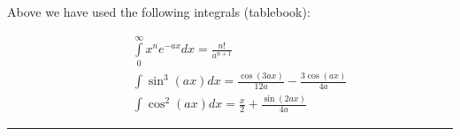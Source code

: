 \begin{enumerate}
Above we have used the following integrals (tablebook):

\begin{eqnarray}
\nonumber
& & \int\limits_{0}^{\infty} x^n e^{-ax}dx = \frac{n!}{a^{n+1}}\\
\nonumber
& & \int\sin^3(ax)dx = \frac{\cos(3ax)}{12a} - \frac{3\cos(ax)}{4a}\\
\nonumber
& & \int\cos^2(ax)dx = \frac{x}{2} + \frac{\sin(2ax)}{4a}
\end{eqnarray}

\end{enumerate}
\hrule\vspace{0.5cm}
